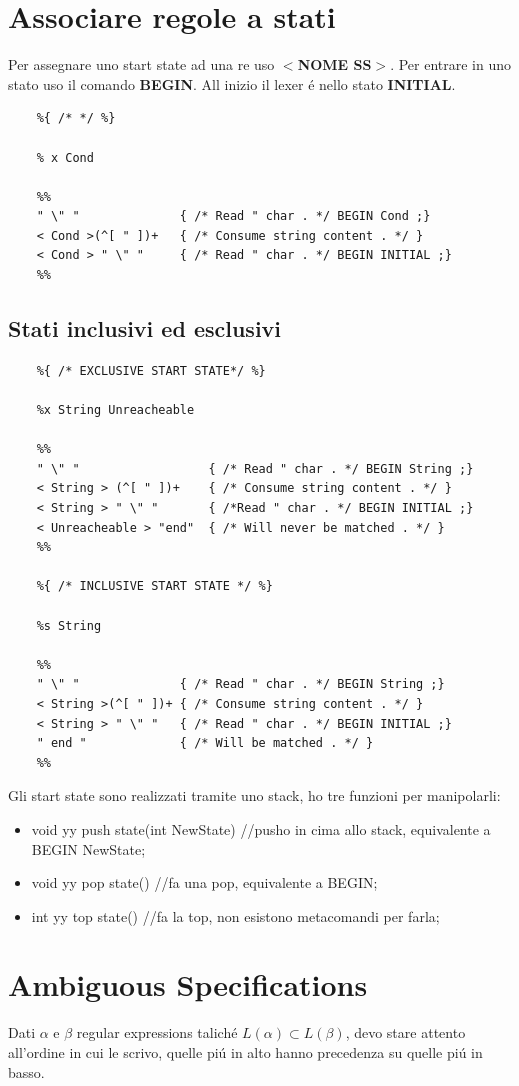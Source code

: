 \section{Associare regole a stati}
Per assegnare uno start state ad una re uso \textbf{$<$NOME SS$>$}.
Per entrare in uno stato uso il comando \textbf{BEGIN}.
All inizio il lexer \'e nello stato \textbf{INITIAL}.
\begin{lstlisting}
	%{ /* */ %}

	% x Cond
	
	%%
	" \" "				{ /* Read " char . */ BEGIN Cond ;}
	< Cond >(^[ " ])+	{ /* Consume string content . */ }
	< Cond > " \" "		{ /* Read " char . */ BEGIN INITIAL ;}
	%%
\end{lstlisting}

\subsection{Stati inclusivi ed esclusivi}
\begin{lstlisting}
	%{ /* EXCLUSIVE START STATE*/ %}

	%x String Unreacheable

	%%
	" \" "					{ /* Read " char . */ BEGIN String ;}
	< String > (^[ " ])+	{ /* Consume string content . */ }
	< String > " \" "		{ /*Read " char . */ BEGIN INITIAL ;}
	< Unreacheable > "end"	{ /* Will never be matched . */ }
	%%

	%{ /* INCLUSIVE START STATE */ %}
	
	%s String
	
	%%
	" \" " 				{ /* Read " char . */ BEGIN String ;}
	< String >(^[ " ])+	{ /* Consume string content . */ }
	< String > " \" " 	{ /* Read " char . */ BEGIN INITIAL ;}
	" end "				{ /* Will be matched . */ }
	%%
\end{lstlisting}
Gli start state sono realizzati tramite uno stack, ho tre funzioni per manipolarli:
\begin{itemize}
	\item void yy push state(int NewState) //pusho in cima allo stack, equivalente a BEGIN NewState;\\
	\item void yy pop state() //fa una pop, equivalente a BEGIN;\\
	\item int yy top state() //fa la top, non esistono metacomandi per farla;\\
\end{itemize}

\section{Ambiguous Specifications}
Dati $\alpha$ e $\beta$ regular expressions talich\'e $L(\alpha ) \subset L(\beta )$, devo stare attento all'ordine in cui le scrivo, quelle pi\'u in alto hanno precedenza su quelle pi\'u in basso. 

